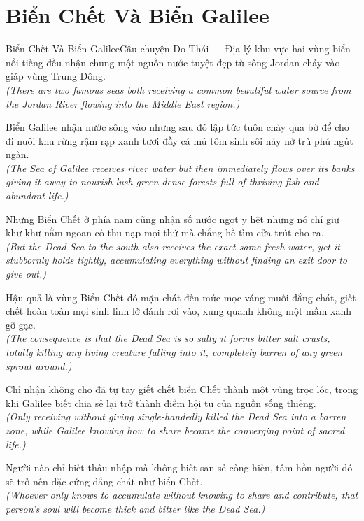 \section{Biển Chết Và Biển Galilee}
\begin{truyen}{Biển Chết Và Biển Galilee}{Câu chuyện Do Thái --- Địa lý khu vực}
 hai vùng biển nổi tiếng đều nhận chung một nguồn nước tuyệt đẹp từ sông Jordan chảy vào giáp vùng Trung Đông.\\[4pt]
\textit{(There are two famous seas both receiving a common beautiful water source from the Jordan River flowing into the Middle East region.)}

Biển Galilee nhận nước sông vào nhưng sau đó lập tức tuôn chảy qua bờ để cho đi nuôi khu rừng rậm rạp xanh tươi đầy cá mú tôm sinh sôi nảy nở trù phú ngút ngàn.\\[4pt]
\textit{(The Sea of Galilee receives river water but then immediately flows over its banks giving it away to nourish lush green dense forests full of thriving fish and abundant life.)}

Nhưng Biển Chết ở phía nam cũng nhận số nước ngọt y hệt nhưng nó chỉ giữ khư khư nằm ngoan cố thu nạp mọi thứ mà chẳng hề tìm cửa trút cho ra.\\[4pt]
\textit{(But the Dead Sea to the south also receives the exact same fresh water, yet it stubbornly holds tightly, accumulating everything without finding an exit door to give out.)}

Hậu quả là vùng Biển Chết đó mặn chát đến mức mọc váng muối đắng chát, giết chết hoàn toàn mọi sinh linh lỡ đánh rơi vào, xung quanh không một mầm xanh gỡ gạc.\\[4pt]
\textit{(The consequence is that the Dead Sea is so salty it forms bitter salt crusts, totally killing any living creature falling into it, completely barren of any green sprout around.)}

Chỉ nhận không cho đã tự tay giết chết biển Chết thành một vùng trọc lóc, trong khi Galilee biết chia sẻ lại trở thành điểm hội tụ của nguồn sống thiêng.\\[4pt]
\textit{(Only receiving without giving single-handedly killed the Dead Sea into a barren zone, while Galilee knowing how to share became the converging point of sacred life.)}

\end{truyen}
\begin{baihoc}
  Người nào chỉ biết thâu nhập mà không biết san sẻ cống hiến, tâm hồn người đó sẽ trở nên đặc cứng đắng chát như biển Chết.\\[4pt]
  \textit{(Whoever only knows to accumulate without knowing to share and contribute, that person's soul will become thick and bitter like the Dead Sea.)}
\end{baihoc}


